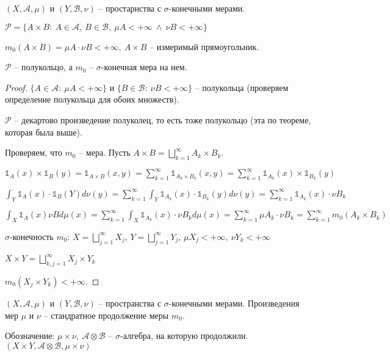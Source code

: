 \begin{definition}
    $\left(X, \mathcal{A}, \mu\right)$ и $\left(Y, \mathcal{B}, \nu\right)$ -- простарнства с $\sigma$-конечными мерами.

    $\mathcal{P} = \{ A \times B : \ A \in \mathcal{A}, \ B \in \mathcal{B}, \ \mu A < +\infty \  \land \ \nu B < +\infty \}$

    $m_0 (A \times B) = \mu A \cdot \nu B < +\infty, \ A \times B$ -- измеримый прямоугольник.
\end{definition}
\begin{theorem}
    $\mathcal{P}$ -- полукольцо, а $m_0$ -- $\sigma$-конечная мера на нем.
\end{theorem}
\begin{proof}
    $\{ A \in \mathcal{A}: \ \mu A < +\infty \}$ и $\{ B \in \mathcal{B}: \ \nu B < +\infty \}$ -- полукольца (проверяем определение полукольца для обоих множеств).

    $\mathcal{P}$ -- декартово произведение полуколец, то есть тоже полукольцо (эта по теореме, которая была выше).

    Проверяем, что $m_0$ -- мера. Пусть $A \times B = \bigsqcup_{k=1}^{\infty} A_k \times B_k$.

    $\mathbb{1}_A(x) \times \mathbb{1}_B(y) = \mathbb{1}_{A \times B} (x, y) = \sum_{k=1}^{\infty} \mathbb{1}_{A_k \times B_k} (x, y) = \sum_{k=1}^{\infty} \mathbb{1}_{A_k}(x) \times \mathbb{1}_{B_k}(y)$

    $\int_Y {\mathbb{1}_A(x) \cdot \mathbb{1}_B(Y) d \nu (y)} = \sum_{k=1}^{\infty} \int_Y{\mathbb{1}_{A_k}(x) \cdot \mathbb{1}_{B_k}(y) d \nu (y)} = \sum_{k=1}^{\infty} \mathbb{1}_{A_k} (x) \cdot \nu B_k$

    $\int_X {\mathbb{1}_A(x) \nu B d \mu(x)} = \sum_{k=1}^{\infty} \int_{X} {\mathbb{1}_{A_k}(x) \cdot \nu B_k d \mu (x)} = \sum_{k=1}^{\infty} \mu A_k \cdot \nu B_k = \sum_{k=1}^{\infty} m_0 (A_k \times B_k)$

    $\sigma$-конечность $m_0$: $X = \bigsqcup_{j=1}^{\infty} X_j$, $Y = \bigsqcup_{j=1}^{\infty} Y_j$, $\mu X_j < +\infty, \ \nu Y_k < +\infty$

    $X \times Y = \bigsqcup_{k, j = 1}^{\infty} X_j \times Y_k$

    $m_0 (X_j \times Y_k) < +\infty$.
\end{proof}

\begin{definition}
    $(X, \mathcal{A}, \mu)$ и $(Y, \mathcal{B}, \nu)$ -- пространства с $\sigma$-конечными мерами. Произведения мер $\mu$ и $\nu$ -- стандратное продолжение меры $m_0$.

    Обозначение: $\mu \times \nu, \ \mathcal{A} \otimes \mathcal{B}$ -- $\sigma$-алгебра, на которую продолжили. $(X \times Y, \mathcal{A} \otimes \mathcal{B}, \mu \times \nu)$
\end{definition}

